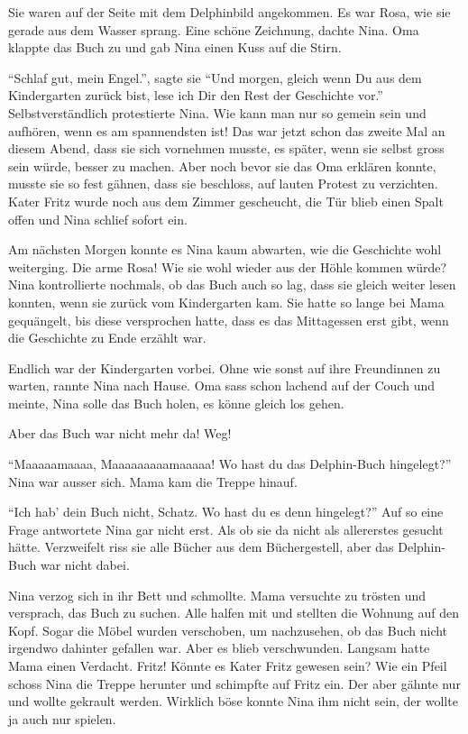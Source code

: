 \vspace{10pt}
 \centerline{\Huge \Dolphin[red]}
\vspace{10pt}

Sie waren auf der Seite mit dem Delphinbild angekommen. Es war Rosa, wie sie gerade aus dem Wasser sprang. Eine schöne Zeichnung, dachte Nina. Oma klappte das Buch zu und gab Nina einen Kuss auf die Stirn.

\enquote{Schlaf gut, mein Engel.}, sagte sie \enquote{Und morgen, gleich wenn Du aus dem Kindergarten zurück bist, lese ich Dir den Rest der Geschichte vor.} Selbstverständlich protestierte Nina. Wie kann man nur so gemein sein und aufhören, wenn es am spannendsten ist! Das war jetzt schon das zweite Mal an diesem Abend, dass sie sich vornehmen musste, es später, wenn sie selbst gross sein würde, besser zu machen. Aber noch bevor sie das Oma erklären konnte, musste sie so fest gähnen, dass sie beschloss, auf lauten Protest zu verzichten. Kater Fritz wurde noch aus dem Zimmer gescheucht, die Tür blieb einen Spalt offen und Nina schlief sofort ein.

Am nächsten Morgen konnte es Nina kaum abwarten, wie die Geschichte wohl weiterging. Die arme Rosa! Wie sie wohl wieder aus der Höhle kommen würde? Nina kontrollierte nochmals, ob das Buch auch so lag, dass sie gleich weiter lesen konnten, wenn sie zurück vom Kindergarten kam. Sie hatte so lange bei Mama gequängelt, bis diese versprochen hatte, dass es das Mittagessen erst gibt, wenn die Geschichte zu Ende erzählt war.

Endlich war der Kindergarten vorbei. Ohne wie sonst auf ihre Freundinnen zu warten, rannte Nina nach Hause. Oma sass schon lachend auf der Couch und meinte, Nina solle das Buch holen, es könne gleich los gehen.

Aber das Buch war nicht mehr da! Weg!

\enquote{Maaaaamaaaa, Maaaaaaaaamaaaaa! Wo hast du das Delphin-Buch hingelegt?} Nina war ausser sich. Mama kam die Treppe hinauf.

\enquote{Ich hab' dein Buch nicht, Schatz. Wo hast du es denn hingelegt?} Auf so eine Frage antwortete Nina gar nicht erst. Als ob sie da nicht als allererstes gesucht hätte. Verzweifelt riss sie alle Bücher aus dem Büchergestell, aber das Delphin-Buch war nicht dabei.

Nina verzog sich in ihr Bett und schmollte. Mama versuchte zu trösten und versprach, das Buch zu suchen. Alle halfen mit und stellten die Wohnung auf den Kopf. Sogar die Möbel wurden verschoben, um nachzusehen, ob das Buch nicht irgendwo dahinter gefallen war. Aber es blieb verschwunden.  Langsam hatte Mama einen Verdacht. Fritz! Könnte es Kater Fritz gewesen sein? Wie ein Pfeil schoss Nina die Treppe herunter und schimpfte auf Fritz ein. Der aber gähnte nur und wollte gekrault werden. Wirklich böse konnte Nina ihm nicht sein, der wollte ja auch nur spielen.

